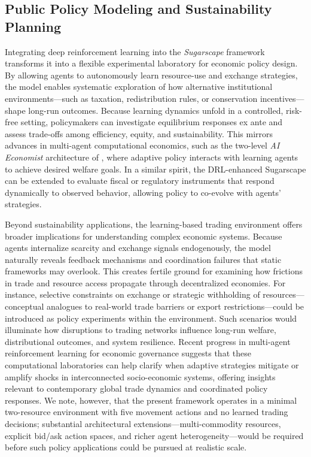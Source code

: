 \documentclass[pdflatex,sn-mathphys-num]{sn-jnl}%
\theoremstyle{thmstyleone}%
\theoremstyle{thmstyletwo}%
\theoremstyle{thmstylethree}%
\begin{document}
\subsection{Public Policy Modeling and Sustainability Planning}
Integrating deep reinforcement learning into the \textit{Sugarscape} framework transforms it into a flexible experimental laboratory for economic policy design. By allowing agents to autonomously learn resource-use and exchange strategies, the model enables systematic exploration of how alternative institutional environments---such as taxation, redistribution rules, or conservation incentives---shape long-run outcomes. Because learning dynamics unfold in a controlled, risk-free setting, policymakers can investigate equilibrium responses ex ante and assess trade-offs among efficiency, equity, and sustainability. This mirrors advances in multi-agent computational economics, such as the two-level \textit{AI Economist} architecture of \citet{Zheng2022}, where adaptive policy interacts with learning agents to achieve desired welfare goals. In a similar spirit, the DRL-enhanced Sugarscape can be extended to evaluate fiscal or regulatory instruments that respond dynamically to observed behavior, allowing policy to co-evolve with agents' strategies.

Beyond sustainability applications, the learning-based trading environment offers broader implications for understanding complex economic systems. Because agents internalize scarcity and exchange signals endogenously, the model naturally reveals feedback mechanisms and coordination failures that static frameworks may overlook. This creates fertile ground for examining how frictions in trade and resource access propagate through decentralized economies. For instance, selective constraints on exchange or strategic withholding of resources---conceptual analogues to real-world trade barriers or export restrictions---could be introduced as policy experiments within the environment. Such scenarios would illuminate how disruptions to trading networks influence long-run welfare, distributional outcomes, and system resilience. Recent progress in multi-agent reinforcement learning for economic governance \citep{RuddJones2025} suggests that these computational laboratories can help clarify when adaptive strategies mitigate or amplify shocks in interconnected socio-economic systems, offering insights relevant to contemporary global trade dynamics and coordinated policy responses.
We note, however, that the present framework operates in a minimal two-resource environment with five movement actions and no learned trading decisions; substantial architectural extensions---multi-commodity resources, explicit bid/ask action spaces, and richer agent heterogeneity---would be required before such policy applications could be pursued at realistic scale.
\end{document}

